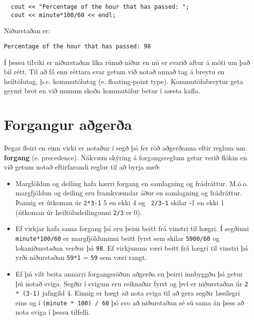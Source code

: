 \begin{verbatim}
  cout << "Percentage of the hour that has passed: ";
  cout << minute*100/60 << endl;
\end{verbatim}
%
Niðurstaðan er:

\begin{verbatim}
Percentage of the hour that has passed: 98
\end{verbatim}
%
Í þessu tilviki er niðurstaðan líka rúnuð niður en nú er svarið aftur á móti um það bil rétt.
Til að fá enn réttara svar getum við notað annað tag á breytu en heiltölutag, þ.e. kommutölutag (e. floating-point type).
Kommutölubreytur geta geymt brot en við munum skoða kommutölur betur í næsta kafla.

\section{Forgangur aðgerða}

Þegar fleiri en einn virki er notaður í segð þá fer röð aðgerðanna eftir reglum um {\bf forgang} (e. precedence).
Nákvæm skýring á forgangsreglum getur verið flókin en við getum notað eftirfarandi reglur til að byrja með:

\begin{itemize}

\item Margföldun og deiling hafa hærri forgang en samlagning og frádráttur.
M.ö.o. margfjöldun og deiling eru framkvæmdar áður en samlagning og frádráttur.
Þannig er útkoman úr {\tt 2*3-1} 5 en ekki 4 og {\tt
2/3-1} skilar -1 en ekki 1 (útkoman úr heiltöludeilingunni {\tt 2/3} er 0).

\item Ef virkjar hafa sama forgang þá eru þeim beitt frá vinstri til hægri.
Í segðinni {\tt minute*100/60} er margfjölduninni beitt fyrst sem skilar {\tt 5900/60} og lokaniðurstaðan verður þá {\tt 98}.
Ef virkjunum væri beitt frá hægri til vinstri þá yrði niðurstaðan {\tt 59*1} = {\tt 59} sem væri rangt.

\item Ef þú vilt beita annarri forgangsröðun aðgerða en þeirri innbyggðu þá getur þú notað sviga.
Segðir í svigum eru reiknaðar fyrst og því er niðurstaðan úr {\tt 2 * (3-1)} jafngild 4.
Einnig er hægt að nota sviga til að gera segðir læsilegri eins og í {\tt (minute * 100) / 60} þó svo að niðurstaðan sé sú sama án þess að nota sviga í þessu tilfelli.

\end{itemize}

